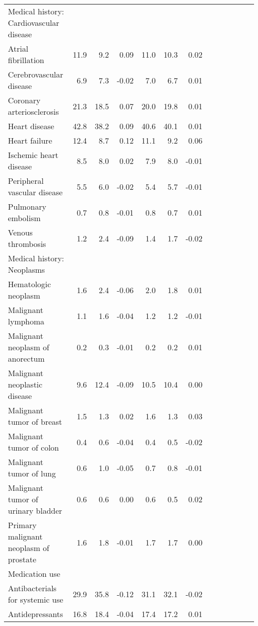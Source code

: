 \documentclass[11pt,]{article}
\begin{document}
\begin{longtable}{lrrrrrrrrrrrr}
  Medical history: Cardiovascular disease &    &    &     &    &    &     \\ 
      Atrial fibrillation & 11.9 &  9.2 &  0.09 & 11.0 & 10.3 &  0.02 \\ 
      Cerebrovascular disease &  6.9 &  7.3 & -0.02 &  7.0 &  6.7 &  0.01 \\ 
      Coronary arteriosclerosis & 21.3 & 18.5 &  0.07 & 20.0 & 19.8 &  0.01 \\ 
      Heart disease & 42.8 & 38.2 &  0.09 & 40.6 & 40.1 &  0.01 \\ 
      Heart failure & 12.4 &  8.7 &  0.12 & 11.1 &  9.2 &  0.06 \\ 
      Ischemic heart disease &  8.5 &  8.0 &  0.02 &  7.9 &  8.0 & -0.01 \\ 
      Peripheral vascular disease &  5.5 &  6.0 & -0.02 &  5.4 &  5.7 & -0.01 \\ 
      Pulmonary embolism &  0.7 &  0.8 & -0.01 &  0.8 &  0.7 &  0.01 \\ 
      Venous thrombosis &  1.2 &  2.4 & -0.09 &  1.4 &  1.7 & -0.02 \\ 
  Medical history: Neoplasms &    &    &     &    &    &     \\ 
      Hematologic neoplasm &  1.6 &  2.4 & -0.06 &  2.0 &  1.8 &  0.01 \\ 
      Malignant lymphoma &  1.1 &  1.6 & -0.04 &  1.2 &  1.2 & -0.01 \\ 
      Malignant neoplasm of anorectum &  0.2 &  0.3 & -0.01 &  0.2 &  0.2 &  0.01 \\ 
      Malignant neoplastic disease &  9.6 & 12.4 & -0.09 & 10.5 & 10.4 &  0.00 \\ 
      Malignant tumor of breast &  1.5 &  1.3 &  0.02 &  1.6 &  1.3 &  0.03 \\ 
      Malignant tumor of colon &  0.4 &  0.6 & -0.04 &  0.4 &  0.5 & -0.02 \\ 
      Malignant tumor of lung &  0.6 &  1.0 & -0.05 &  0.7 &  0.8 & -0.01 \\ 
      Malignant tumor of urinary bladder &  0.6 &  0.6 &  0.00 &  0.6 &  0.5 &  0.02 \\ 
      Primary malignant neoplasm of prostate &  1.6 &  1.8 & -0.01 &  1.7 &  1.7 &  0.00 \\ 
  Medication use &    &    &     &    &    &     \\ 
      Antibacterials for systemic use & 29.9 & 35.8 & -0.12 & 31.1 & 32.1 & -0.02 \\ 
      Antidepressants & 16.8 & 18.4 & -0.04 & 17.4 & 17.2 &  0.01 \\ 

\end{longtable}
\end{document}
